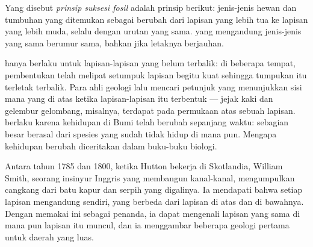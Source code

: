 \begin{definition}\label{def:g7:geological-time:fossil-succession}
Yang disebut \emph{prinsip suksesi fosil} adalah prinsip berikut: jenis-jenis hewan dan tumbuhan yang ditemukan sebagai
 berubah dari lapisan yang lebih tua ke lapisan yang lebih muda, selalu
dengan urutan yang sama.  yang mengandung jenis-jenis  yang sama
berumur sama, bahkan jika letaknya berjauhan.
\end{definition}


 hanya berlaku untuk lapisan-lapisan yang belum
terbalik: di beberapa tempat, pembentukan  telah melipat setumpuk
lapisan begitu kuat sehingga tumpukan itu terletak terbalik. Para ahli
geologi lalu mencari petunjuk yang menunjukkan sisi mana yang di atas ketika
lapisan-lapisan itu terbentuk --- jejak kaki dan gelembur gelombang,
misalnya, terdapat pada permukaan atas sebuah lapisan.  berlaku karena kehidupan di Bumi telah berubah sepanjang waktu:
sebagian besar  berasal dari spesies yang sudah tidak hidup di mana
pun. Mengapa kehidupan berubah diceritakan dalam buku-buku biologi.

\begin{history}
Antara tahun 1785 dan 1800, ketika Hutton bekerja di Skotlandia, William
Smith, seorang insinyur Inggris yang membangun kanal-kanal, mengumpulkan
 cangkang dari batu kapur dan serpih yang digalinya. Ia mendapati
bahwa setiap lapisan mengandung  sendiri, yang berbeda dari 
lapisan di atas dan di bawahnya. Dengan memakai  ini sebagai
penanda, ia dapat mengenali lapisan yang sama di mana pun lapisan itu
muncul, dan ia menggambar beberapa  geologi pertama untuk daerah yang
luas.
\end{history}

